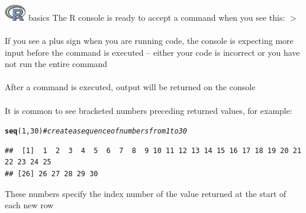 \documentclass[xcolor=svgnames]{beamer}\usepackage[]{graphicx}\usepackage[]{color}
\makeatletter
\newcommand{\hlnum}[1]{\textcolor[rgb]{0.686,0.059,0.569}{#1}}%
\newcommand{\hlcom}[1]{\textcolor[rgb]{0.678,0.584,0.686}{\textit{#1}}}%
\newcommand{\hlstd}[1]{\textcolor[rgb]{0.345,0.345,0.345}{#1}}%
\newcommand{\hlkwd}[1]{\textcolor[rgb]{0.737,0.353,0.396}{\textbf{#1}}}%
\newenvironment{kframe}{%
 \def\at@end@of@kframe{}%
 \ifinner\ifhmode%
  \def\at@end@of@kframe{\end{minipage}}%
  \begin{minipage}{\columnwidth}%
 \fi\fi%
 \def\FrameCommand##1{\hskip\@totalleftmargin \hskip-\fboxsep
 \colorbox{shadecolor}{##1}\hskip-\fboxsep
     \hskip-\linewidth \hskip-\@totalleftmargin \hskip\columnwidth}%
 \MakeFramed {\advance\hsize-\width
   \@totalleftmargin\z@ \linewidth\hsize
   \@setminipage}}%
 {\par\unskip\endMakeFramed%
 \at@end@of@kframe}
\newenvironment{knitrout}{}{} %
\makeatother
\begin{document}
\begin{frame}[fragile]{\includegraphics[width=0.07\textwidth]{Rlogo.jpg} \hspace{0.01in} basics}
The R console is ready to accept a command when you see this: $>$ \\~\\
If you see a plus sign when you are running code, the console is expecting more input before the command is executed -- either your code is incorrect or you have not run the entire command \\~\\
After a command is executed, output will be returned on the console \\~\\
It is common to see bracketed numbers preceding returned values, for example:
\begin{knitrout}\scriptsize
{}\color{fgcolor}\begin{kframe}
\begin{alltt}
\hlkwd{seq}\hlstd{(}\hlnum{1}\hlstd{,} \hlnum{30}\hlstd{)} \hlcom{# create a sequence of numbers from 1 to 30}
\end{alltt}
\begin{verbatim}
##  [1]  1  2  3  4  5  6  7  8  9 10 11 12 13 14 15 16 17 18 19 20 21 22 23 24 25
## [26] 26 27 28 29 30
\end{verbatim}
\end{kframe}
\end{knitrout}
These numbers specify the index number of the value returned at the start of each new row
\end{frame}
\end{document}
